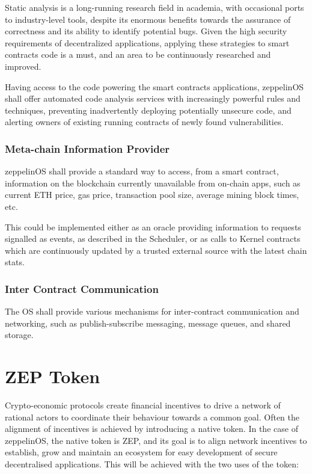 \documentclass[]{article}
\makeatletter
\DeclareRobustCommand{\_}{%
  \leavevmode\vbox{%
    \hrule\@width.5em
          \@height-.26ex
          \@depth\dimexpr.26ex+.28pt\relax}}
\makeatother
\begin{document}
Static analysis is a long-running research field in academia, with
occasional ports to industry-level tools, despite its enormous benefits
towards the assurance of correctness and its ability to identify
potential bugs. Given the high security requirements of decentralized
applications, applying these strategies to smart contracts code is a
must, and an area to be continuously researched and improved.

Having access to the code powering the smart contracts applications,
zeppelinOS shall offer automated code analysis services with
increasingly powerful rules and techniques, preventing inadvertently
deploying potentially unsecure code, and alerting owners of existing
running contracts of newly found vulnerabilities.

\subsubsection{Meta-chain Information Provider}

zeppelinOS shall provide a standard way to access, from a smart
contract, information on the blockchain currently unavailable from
on-chain apps, such as current ETH price, gas price, transaction pool
size, average mining block times, etc.

This could be implemented either as an oracle providing information to
requests signalled as events, as described in the Scheduler, or as calls
to Kernel contracts which are continuously updated by a trusted external
source with the latest chain stats.

\subsubsection{Inter Contract Communication}

The OS shall provide various mechanisms for inter-contract
communication and networking, such as publish-subscribe messaging,
message queues, and shared storage.

\section{ZEP Token}

Crypto-economic protocols create financial incentives to drive a
network of rational actors to coordinate their behaviour towards a
common goal. Often the alignment of incentives is achieved by
introducing a native token. In the case of zeppelinOS, the native
token is ZEP, and its goal is to align network incentives to
establish, grow and maintain an ecosystem for easy development of
secure decentralised applications. This will be achieved with the two
uses of the token:
\end{document}
